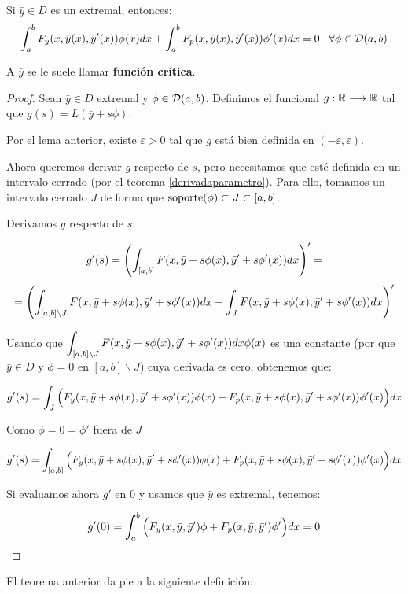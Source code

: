 \begin{theorem}
\label{theorem:1.7}
Si $\bar{y}\in D$ es un extremal, entonces:
\[
\displaystyle\int_{ a }^{ b } F_y(x,\bar{y}(x), \bar{y}'(x))\phi(x)dx+\displaystyle\int_{ a }^{ b } F_p(x,\bar{y}(x), \bar{y}'(x))\phi'(x)dx=0 \;\;\; \forall \phi\in \mathcal{D}(a,b)
\]

A $\bar{y}$ se le suele llamar \textbf{función crítica}.
\end{theorem}

\begin{proof}
Sean $\bar{y}\in D$ extremal y $\phi\in\mathcal{D}(a,b)$. Definimos el funcional $g:\mathbb{R}\longrightarrow\mathbb{R}$ tal que $g(s)=L(\bar{y}+s\phi)$.

Por el lema anterior, existe $\varepsilon>0$ tal que $g$ está bien definida en $(-\varepsilon,\varepsilon)$.

Ahora queremos derivar $g$ respecto de $s$, pero necesitamos que esté definida en un intervalo cerrado (por el teorema \ref{derivadaparametro}). Para ello, tomamos un intervalo cerrado $J$ de forma que $\operatorname{soporte} (\phi)\subset J\subset [a,b]$. 

Derivamos $g$ respecto de $s$:

\[
g'(s)=\left(
\displaystyle\int_{ [a,b] }^{  } F(x,\bar{y}+s\phi(x),\bar{y}'+s\phi'(x))dx
\right)'=
\]
\[
=\left(
\displaystyle\int_{ [a,b]\backslash J }^{  } F(x,\bar{y}+s\phi(x),\bar{y}'+s\phi'(x))dx+
\displaystyle\int_{ J }^{  } F(x,\bar{y}+s\phi(x),\bar{y}'+s\phi'(x))dx
\right)'
\]

Usando que $\displaystyle\int_{ [a,b]\backslash J }^{  } F(x,\bar{y}+s\phi(x),\bar{y}'+s\phi'(x))dx\phi(x)$ es una constante (por que $\bar{y}\in D$ y $\phi = 0$ en $[a,b]\backslash J$) cuya derivada es cero, obtenemos que:

\[
g'(s)= \displaystyle\int_{ J }^{  } \Big(F_y(x,\bar{y}+s\phi(x),\bar{y}'+s\phi'(x))\phi(x)+F_p(x,\bar{y}+s\phi(x),\bar{y}'+s\phi'(x))\phi'(x)\Big)dx
\]

Como $\phi=0=\phi'$ fuera de $J$

\[
g'(s)= \displaystyle\int_{ [a,b] }^{  } \Big(F_y(x,\bar{y}+s\phi(x),\bar{y}'+s\phi'(x))\phi(x)+F_p(x,\bar{y}+s\phi(x),\bar{y}'+s\phi'(x))\phi'(x)\Big)dx
\]

Si evaluamos ahora $g'$ en 0 y usamos que $\bar{y}$ es extremal, tenemos:

\[
g'(0)=\displaystyle\int_{ a }^{ b } \Big(F_y(x,\bar{y},\bar{y}')\phi+F_p(x,\bar{y},\bar{y}')\phi'\Big)dx=0 
\]

\end{proof}

El teorema anterior da pie a la siguiente definición:

